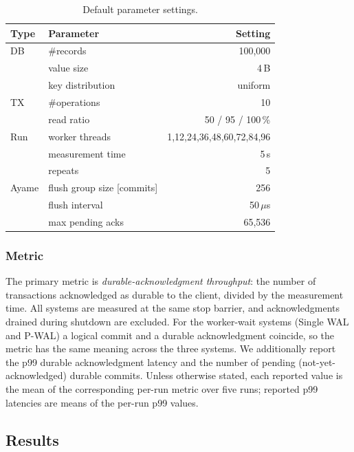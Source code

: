 \begin{table}[tb]
  \centering
  \caption{Default parameter settings.}
  \label{tab:params}
  \small
  \begin{tabular}{llr}
    \hline
    Type & Parameter & Setting \\
    \hline
    DB & \#records & 100{,}000 \\
       & value size & 4\,B \\
       & key distribution & uniform \\
    \hline
    TX & \#operations & 10 \\
       & read ratio & 50 / 95 / 100\,\% \\
    \hline
    Run & worker threads & 1,12,24,36,48,60,72,84,96 \\
        & measurement time & 5\,s \\
        & repeats & 5 \\
    \hline
    Ayame & flush group size [commits] & 256 \\
          & flush interval & 50\,$\mu$s \\
          & max pending acks & 65{,}536 \\
    \hline
  \end{tabular}
\end{table}

\subsubsection{Metric}
\label{sec:metric}

The primary metric is \emph{durable-acknowledgment throughput}: the
number of transactions acknowledged as durable to the client, divided by
the measurement time.  All systems are measured at the same stop
barrier, and acknowledgments drained during shutdown are excluded.  For
the worker-wait systems (Single WAL and P-WAL) a logical commit and a
durable acknowledgment coincide, so the metric has the same meaning
across the three systems.  We additionally report the p99 durable
acknowledgment latency and the number of pending (not-yet-acknowledged)
durable commits.  Unless otherwise stated, each reported value is the
mean of the corresponding per-run metric over five runs; reported p99
latencies are means of the per-run p99 values.

\subsection{Results}
\label{sec:results}

